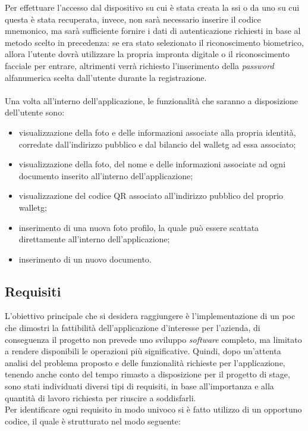 Per effettuare l'accesso dal dispositivo su cui è stata creata la \gls{ssi} o da uno su cui questa è stata recuperata, invece, non sarà necessario inserire il codice mnemonico, ma sarà sufficiente fornire i dati di autenticazione richiesti in base al metodo scelto in precedenza: se era stato selezionato il riconoscimento biometrico, allora l'utente dovrà utilizzare la propria impronta digitale o il riconoscimento facciale per entrare, altrimenti verrà richiesto l'inserimento della \textit{password} alfanumerica scelta dall'utente durante la registrazione.\\\\
Una volta all'interno dell'applicazione, le funzionalità che saranno a disposizione dell'utente sono:

\begin{itemize}
	\item visualizzazione della foto e delle informazioni associate alla propria identità, corredate dall'indirizzo pubblico e dal bilancio del \gls{walletg} ad essa associato;
	\item visualizzazione della foto, del nome e delle informazioni associate ad ogni documento inserito all'interno dell'applicazione;
	\item visualizzazione del codice QR associato all'indirizzo pubblico del proprio \gls{walletg};
	\item inserimento di una nuova foto profilo, la quale può essere scattata direttamente all'interno dell'applicazione;
	\item inserimento di un nuovo documento.
\end{itemize}

\subsection{Requisiti}

L'obiettivo principale che si desidera raggiungere è l'implementazione di un \gls{poc} che dimostri la fattibilità dell'applicazione d'interesse per l'azienda, di conseguenza il progetto non prevede uno sviluppo \textit{software} completo, ma limitato a rendere disponibili le operazioni più significative. Quindi, dopo un'attenta analisi del problema proposto e delle funzionalità richieste per l'applicazione, tenendo anche conto del tempo rimasto a disposizione per il progetto di stage, sono stati individuati diversi tipi di requisiti, in base all'importanza e alla quantità di lavoro richiesta per riuscire a soddisfarli.\\
Per identificare ogni requisito in modo univoco si è fatto utilizzo di un opportuno codice, il quale è strutturato nel modo seguente:\\

